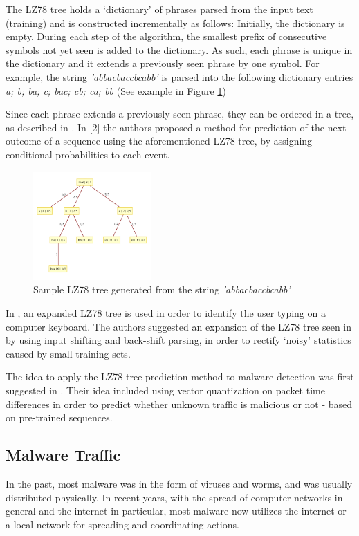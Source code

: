 \documentclass[13pt,journal,compsoc,onecolumn]{IEEEtran}
\begin{document}
The LZ78 tree holds a ‘dictionary’ of phrases parsed from the input text (training) and is constructed incrementally as follows:
Initially, the dictionary is empty. During each step of the algorithm, the smallest prefix of consecutive symbols not yet seen is added to the dictionary. As such, each phrase is unique in the dictionary and it extends a previously seen phrase by one symbol.
For example, the string \emph{'abbacbaccbcabb'} is parsed into the following dictionary entries \emph{a; b; ba; c; bac; cb; ca; bb} (See example in Figure \ref{fig:lztree})

Since each phrase extends a previously seen phrase, they can be ordered in a tree, as described in \cite{Lan83}. In [2] the authors proposed a method for prediction of the next outcome of a sequence using the aforementioned LZ78 tree, by assigning conditional probabilities to each event.
\begin{figure}[!ht]
 \centering
 \includegraphics[width=0.40\textwidth]{sampletree.pdf}
 \caption{Sample LZ78 tree generated from the string \emph{'abbacbaccbcabb'}\label{fig:lztree}}
\end{figure} 
In \cite{Nis03}, an expanded LZ78 tree is used in order to identify the user typing on a computer keyboard. The authors suggested an expansion of the LZ78 tree seen in \cite{Lan83} by using input shifting and back-shift parsing, in order to rectify ‘noisy’ statistics caused by small training sets.

The idea to apply the LZ78 tree prediction method to malware detection was first suggested in \cite{Coh12}. Their idea included using vector quantization on packet time differences in order to predict whether unknown traffic is malicious or not - based on pre-trained sequences.


\subsection{Malware Traffic}
\label{sec:malwaretraffic}
In the past, most malware was in the form of viruses and worms, and was usually distributed physically. In recent years, with the spread of computer networks in general and the internet in particular, most malware now utilizes the internet or a local network for spreading and coordinating actions.
\end{document}
